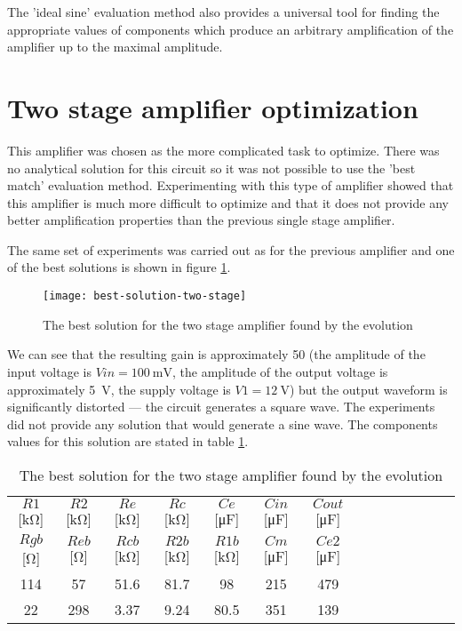 The 'ideal sine' evaluation method also provides a universal tool for finding the appropriate values of components which produce an arbitrary amplification of the amplifier up to the maximal amplitude.

\section{Two stage amplifier optimization} \label{2stage-results}
This amplifier was chosen as the more complicated task to optimize. There was no analytical solution for this circuit so it was not possible to use the 'best match' evaluation method. Experimenting with this type of amplifier showed that this amplifier is much more difficult to optimize and that it does not provide any better amplification properties than the previous single stage amplifier.

The same set of experiments was carried out as for the previous amplifier and one of the best solutions is shown in figure \ref{best-solution-two-stage-fig}.

\begin{figure}[ht]
    \centerline{\texttt{[image: best-solution-two-stage]}\label{best-solution-two-stage-fig}}
    \caption{The best solution for the two stage amplifier found by the evolution}
\end{figure}

We can see that the resulting gain is approximately 50 (the amplitude of the input voltage is $Vin = \SI{100}{\milli\volt}$, the amplitude of the output voltage is approximately \SI{5}{\volt}, the supply voltage is $V1 = \SI{12}{\volt}$) but the output waveform is significantly distorted --- the circuit generates a square wave. The experiments did not provide any solution that would generate a sine wave. The components values for this solution are stated in table \ref{best-solution-two-stage-tab}.

\begin{table}[H]
\centering
\begin{tabular}{@{}cccccccccccccc@{}}
\toprule
    $R1$ [\si{\kilo\ohm}] & $R2$ [\si{\kilo\ohm}] & $Re$ [\si{\kilo\ohm}] & $Rc$ [\si{\kilo\ohm}] & $Ce$ [\si{\micro\farad}] & $Cin$ [\si{\micro\farad}] & $Cout$ [\si{\micro\farad}] \\
    $Rgb$ [\si{\ohm}] & $Reb$ [\si{\ohm}] & $Rcb$ [\si{\kilo\ohm}] & $R2b$ [\si{\kilo\ohm}] & $R1b$ [\si{\kilo\ohm}] & $Cm$ [\si{\micro\farad}] & $Ce2$ [\si{\micro\farad}] \\
    \midrule
    114 & 57  & 51.6 & 81.7 & 98   & 215 & 479 & \\
    22  & 298 & 3.37 & 9.24 & 80.5 & 351 & 139   \\
    \bottomrule
\end{tabular}
\caption{The best solution for the two stage amplifier found by the evolution}
\label{best-solution-two-stage-tab}
\end{table}
